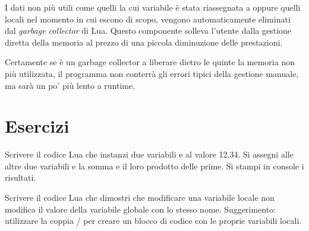 I dati non più utili come quelli la cui variabile è stata riassegnata a
 oppure quelli locali nel momento in cui escono di scopo, vengono
automaticamente eliminati dal \emph{garbage collector} di Lua. Questo componente
solleva l'utente dalla gestione diretta della memoria al prezzo di una piccola
diminuzione delle prestazioni.

Certamente se è un garbage collector a liberare dietro le quinte la memoria non
più utilizzata, il programma non conterrà gli errori tipici della gestione
manuale, ma sarà un po' più lento a runtime.


\section{Esercizi}

\begin{Exercise}[label=fond-01]
Scrivere il codice Lua che instanzi due variabili  e  al valore
12.34. Si assegni alle altre due variabili  e  la somma e il
loro prodotto delle prime. Si stampi in console i risultati.
\end{Exercise}

\begin{Exercise}[label=fond-02]
Scrivere il codice Lua che dimostri che modificare una variabile locale non
modifica il valore della variabile globale con lo stesso nome. Suggerimento:
utilizzare la coppia / per creare un blocco di codice con le
proprie variabili locali.
\end{Exercise}

